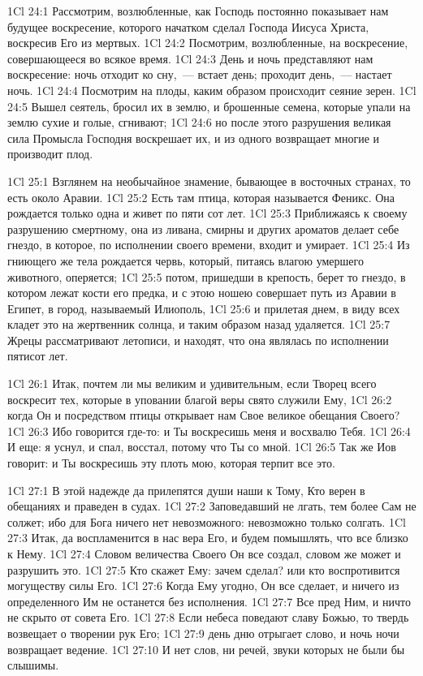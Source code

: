 \vs 1Cl 24:1
Рассмотрим, возлюбленные,
как Господь постоянно показывает нам будущее воскресение, которого начатком
сделал Господа Иисуса Христа, воскресив Его из мертвых.
\vs 1Cl 24:2
Посмотрим, возлюбленные,
на воскресение, совершающееся во всякое время.
\vs 1Cl 24:3
День и ночь представляют
нам воскресение: ночь отходит ко сну,~--- встает день; проходит день,~--- настает
ночь.
\vs 1Cl 24:4
Посмотрим на плоды, каким
образом происходит сеяние зерен.
\vs 1Cl 24:5
Вышел сеятель, бросил их в
землю, и брошенные семена, которые упали на землю сухие и голые, сгнивают;
\vs 1Cl 24:6
но после этого разрушения
великая сила Промысла Господня воскрешает их, и из одного возвращает многие и
производит плод.

\vs 1Cl 25:1
Взглянем на необычайное
знамение, бывающее в восточных странах, то есть около Аравии.
\vs 1Cl 25:2
Есть там птица, которая
называется Феникс. Она рождается только одна и живет по пяти сот лет.
\vs 1Cl 25:3
Приближаясь к своему
разрушению смертному, она из ливана, смирны и других ароматов делает себе
гнездо, в которое, по исполнении своего времени, входит и умирает.
\vs 1Cl 25:4
Из гниющего же тела
рождается червь, который, питаясь влагою умершего животного, оперяется;
\vs 1Cl 25:5
потом, пришедши в
крепость, берет то гнездо, в котором лежат кости его предка, и с этою ношею
совершает путь из Аравии в Египет, в город, называемый Илиополь,
\vs 1Cl 25:6
и прилетая днем, в виду
всех кладет это на жертвенник солнца, и таким образом назад удаляется.
\vs 1Cl 25:7
Жрецы рассматривают
летописи, и находят, что она являлась по исполнении пятисот лет.

\vs 1Cl 26:1
Итак, почтем ли мы
великим и удивительным, если Творец всего воскресит тех, которые в уповании
благой веры свято служили Ему,
\vs 1Cl 26:2
когда Он и посредством
птицы открывает нам Свое великое обещания Своего?
\vs 1Cl 26:3
Ибо говорится где-то: и
Ты воскресишь меня и восхвалю Тебя.
\vs 1Cl 26:4
И еще: я уснул, и спал,
восстал, потому что Ты со мной.
\vs 1Cl 26:5
Так же Иов говорит: и Ты
воскресишь эту плоть мою, которая терпит все это.

\vs 1Cl 27:1
В этой надежде да
прилепятся души наши к Тому, Кто верен в обещаниях и праведен в судах.
\vs 1Cl 27:2
Заповедавший не лгать, тем
более Сам не солжет; ибо для Бога ничего нет невозможного: невозможно только
солгать.
\vs 1Cl 27:3
Итак, да воспламенится в
нас вера Его, и будем помышлять, что все близко к Нему.
\vs 1Cl 27:4
Словом величества Своего
Он все создал, словом же может и разрушить это.
\vs 1Cl 27:5
Кто скажет Ему: зачем
сделал? или кто воспротивится могуществу силы Его.
\vs 1Cl 27:6
Когда Ему угодно, Он все
сделает, и ничего из определенного Им не останется без исполнения.
\vs 1Cl 27:7
Все пред Ним, и ничто не
скрыто от совета Его.
\vs 1Cl 27:8
Если небеса поведают
славу Божью, то твердь возвещает о творении рук Его;
\vs 1Cl 27:9
день дню отрыгает слово, и
ночь ночи возвращает ведение.
\vs 1Cl 27:10
И нет слов, ни речей,
звуки которых не были бы слышимы.


